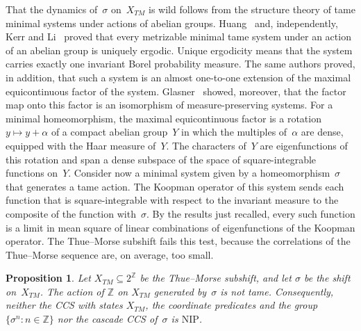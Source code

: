 \documentclass[psamsfonts]{amsart}
\newtheorem{prop}[thm]{Proposition}
\theoremstyle{definition}
\theoremstyle{remark}
\newcommand{\NIP}{\text{NIP}}
\numberwithin{equation}{section}
\begin{document}
That the dynamics of~$\sigma$ on~$X_{TM}$ is wild follows from the structure theory of tame minimal systems under actions of abelian groups.
Huang~\cite{Huang2006} and, independently, Kerr and Li~\cite{KerrLi2007} proved that every metrizable minimal tame system under an action of an abelian group is uniquely ergodic.
Unique ergodicity means that the system carries exactly one invariant Borel probability measure.
The same authors proved, in addition, that such a system is an almost one-to-one extension of the maximal equicontinuous factor of the system.
Glasner~\cite{Glasner2007} showed, moreover, that the factor map onto this factor is an isomorphism of measure-preserving systems.
For a minimal homeomorphism, the maximal equicontinuous factor is a rotation $y\mapsto y+\alpha$ of a compact abelian group~$Y$ in which the multiples of~$\alpha$ are dense, equipped with the Haar measure of~$Y$.
The characters of~$Y$ are eigenfunctions of this rotation and span a dense subspace of the space of square-integrable functions on~$Y$.
Consider now a minimal system given by a homeomorphism~$\sigma$ that generates a tame action.
The Koopman operator of this system sends each function that is square-integrable with respect to the invariant measure to the composite of the function with~$\sigma$.
By the results just recalled, every such function is a limit in mean square of linear combinations of eigenfunctions of the Koopman operator.
The Thue--Morse subshift fails this test, because the correlations of the Thue--Morse sequence are, on average, too small.

\begin{prop}\label{prop:thue-morse}
Let $X_{TM}\subseteq2^{\mathbb{Z}}$ be the Thue--Morse subshift, and let $\sigma$ be the shift on~$X_{TM}$.
The action of $\mathbb{Z}$ on $X_{TM}$ generated by~$\sigma$ is not tame.
Consequently, neither the CCS with states $X_{TM}$, the coordinate predicates and the group $\{\sigma^n:n\in\mathbb{Z}\}$ nor the cascade CCS of~$\sigma$ is $\NIP$.
\end{prop}
\end{document}
